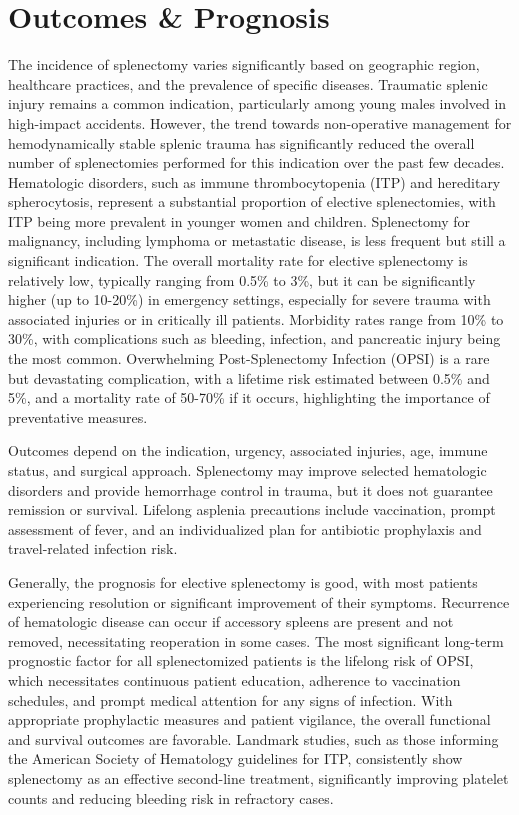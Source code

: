 \section*{Outcomes \& Prognosis}
The incidence of splenectomy varies significantly based on geographic region, healthcare practices, and the prevalence of specific diseases. Traumatic splenic injury remains a common indication, particularly among young males involved in high-impact accidents. However, the trend towards non-operative management for hemodynamically stable splenic trauma has significantly reduced the overall number of splenectomies performed for this indication over the past few decades. Hematologic disorders, such as immune thrombocytopenia (ITP) and hereditary spherocytosis, represent a substantial proportion of elective splenectomies, with ITP being more prevalent in younger women and children. Splenectomy for malignancy, including lymphoma or metastatic disease, is less frequent but still a significant indication. The overall mortality rate for elective splenectomy is relatively low, typically ranging from 0.5\% to 3\%, but it can be significantly higher (up to 10-20\%) in emergency settings, especially for severe trauma with associated injuries or in critically ill patients. Morbidity rates range from 10\% to 30\%, with complications such as bleeding, infection, and pancreatic injury being the most common. Overwhelming Post-Splenectomy Infection (OPSI) is a rare but devastating complication, with a lifetime risk estimated between 0.5\% and 5\%, and a mortality rate of 50-70\% if it occurs, highlighting the importance of preventative measures.

Outcomes depend on the indication, urgency, associated injuries, age, immune status, and surgical approach. Splenectomy may improve selected hematologic disorders and provide hemorrhage control in trauma, but it does not guarantee remission or survival. Lifelong asplenia precautions include vaccination, prompt assessment of fever, and an individualized plan for antibiotic prophylaxis and travel-related infection risk.

Generally, the prognosis for elective splenectomy is good, with most patients experiencing resolution or significant improvement of their symptoms. Recurrence of hematologic disease can occur if accessory spleens are present and not removed, necessitating reoperation in some cases. The most significant long-term prognostic factor for all splenectomized patients is the lifelong risk of OPSI, which necessitates continuous patient education, adherence to vaccination schedules, and prompt medical attention for any signs of infection. With appropriate prophylactic measures and patient vigilance, the overall functional and survival outcomes are favorable. Landmark studies, such as those informing the American Society of Hematology guidelines for ITP, consistently show splenectomy as an effective second-line treatment, significantly improving platelet counts and reducing bleeding risk in refractory cases.

